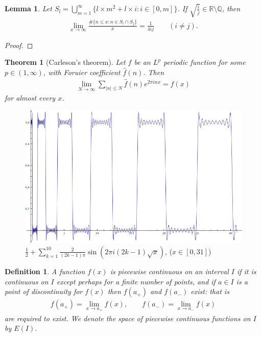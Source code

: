\documentclass[a4paper,10pt]{amsart}
\newtheorem{theorem}{Theorem}[section]
\newtheorem{definition}{Definition}[section]
\newtheorem{lemma}{Lemma}[section]
\newcommand{\R}{\mathbb R}  %
\newcommand{\Q}{\mathbb Q} %
\begin{document}
\begin{lemma}
    Let $S_{l} = \bigcup_{m=1}^{\infty}
    \{l\times m^2 + l\times i : i \in [0, m] \}$.
    If $\sqrt{\frac{i}{j}}  \in \R \setminus \Q$, then
    \begin{align*}
        \lim_{x \rightarrow \infty} 
        \frac{\# \{n \leq x: n \in S_{i} \cap S_{j}\}}{x} = \frac{1}{4ij}
        \qquad (i \neq j). 
    \end{align*}
\end{lemma}

\begin{proof}
   
\end{proof}

\begin{theorem}[Carleson's theorem]
    Let $f$ be an $L^{p}$ periodic function for some $p \in (1, \infty)$,
    with Foruier coefficient $\hat{f}(n)$. Then
    \begin{align*}
        \lim_{N \rightarrow \infty}\sum_{|n|\leq N}
        \hat{f}(n)e^{2\pi inx} = f(x) 
    \end{align*}
    for almost every $x$.
\end{theorem}

\begin{figure}[h]
    \includegraphics[scale=0.3]{fourier_converges.png}
    \caption{$\frac{1}{2} + \sum_{k=1}^{10}
    \frac{2}{(2k-1)\pi}\sin(2\pi i (2k-1)\sqrt{x})$, ($x \in [0, 31]$)}
\end{figure}

\begin{definition}
    A function $f(x)$ is piecewise continuous on an interval $I$ if
    it is continuous on $I$ except perhaps for a finite number of points,
    and if $a \in I$ is a point of discontinuity for $f(x)$ then 
    $f(a_{+})$ and $f(a_{-})$ exist: that is 
    \begin{align*}
        f(a_{+}) = \lim_{x \rightarrow a_{+}}f(x), \qquad 
        f(a_{-}) = \lim_{x \rightarrow a_{-}}f(x)
    \end{align*}
    are required to exist. We denote the space of piecewise continuous
    functions on $I$ by $E(I)$.
\end{definition}
\end{document}
